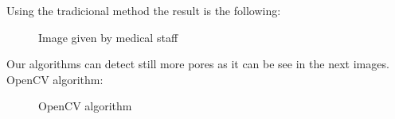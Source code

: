 Using the tradicional method the result is the following:

    \begin{figure}[H]
      \caption{Image given by medical staff}
      \centering \setlength\fboxsep{0pt} \setlength\fboxrule{0.5pt}
    \end{figure}

Our algorithms can detect still more pores as it can be see in the next images.\\
OpenCV algorithm:

    \begin{figure}[H]
      \caption{OpenCV algorithm}
      \centering \setlength\fboxsep{0pt} \setlength\fboxrule{0.5pt}
    \end{figure}

